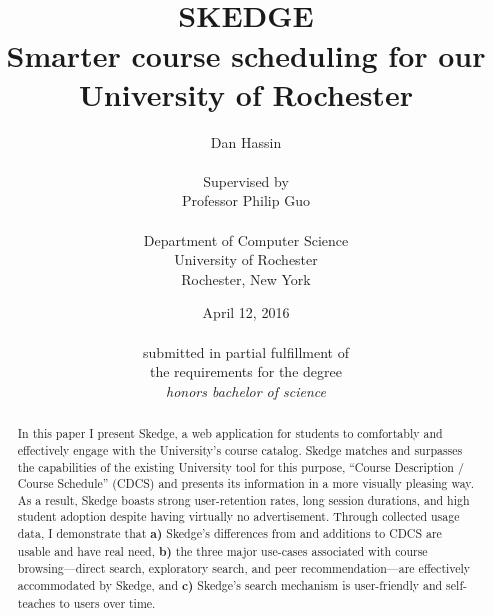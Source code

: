 \documentclass[titlepage]{report}
\title{
\vspace{60pt}\\
\huge \bfseries SKEDGE
\\
\vspace{10pt}
\Large
Smarter course scheduling for our\\
University of Rochester
}
\author{
	Dan Hassin\\
    \vspace{5pt}\\
    Supervised by\\
    Professor Philip Guo\\
    \vspace{2pt}\\
    Department of Computer Science\\
    University of Rochester\\
    Rochester, New York\\
}
\date{April 12, 2016\\
    \vspace{150pt}\\
    submitted in partial fulfillment of\\
    the requirements for the degree\\
    \emph{honors bachelor of science}\\
}
\begin{document}
\maketitle


\onehalfspacing

\setcounter{tocdepth}{1}
\tableofcontents

\listoftables

\listoffigures

\clearpage


\doublespacing


\begin{abstract}

\thispagestyle{plain}

In this paper I present Skedge, a web application for students to comfortably and effectively engage with the University's course catalog. Skedge matches and surpasses the capabilities of the existing University tool for this purpose, ``Course Description / Course Schedule'' (CDCS) and presents its information in a more visually pleasing way. As a result, Skedge boasts strong user-retention rates, long session durations, and high student adoption despite having virtually no advertisement. Through collected usage data, I demonstrate that \textbf{a)} Skedge's differences from and additions to CDCS are usable and have real need, \textbf{b)} the three major use-cases associated with course browsing---direct search, exploratory search, and peer recommendation---are effectively accommodated by Skedge, and \textbf{c)} Skedge's search mechanism is user-friendly and self-teaches to users over time.

\end{abstract}




\setlength{\skip\footins}{0.75cm}



\clearpage


\clearpage


\clearpage


\clearpage


\clearpage


\clearpage
\end{document}
